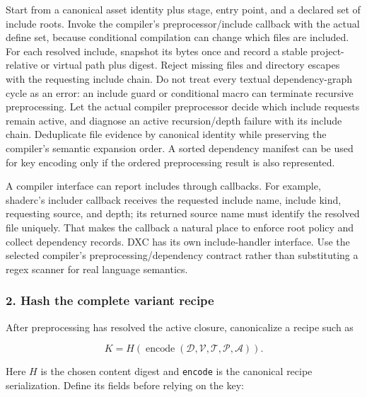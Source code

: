 \hypertarget{05-engine-i-ch010-resolve-a-source-closure-under-a-declared-policy}{}

Start from a canonical asset identity plus stage, entry point, and a declared set of include roots. Invoke the compiler's preprocessor/include callback with the actual define set, because conditional compilation can change which files are included. For each resolved include, snapshot its bytes once and record a stable project-relative or virtual path plus digest. Reject missing files and directory escapes with the requesting include chain. Do not treat every textual dependency-graph cycle as an error: an include guard or conditional macro can terminate recursive preprocessing. Let the actual compiler preprocessor decide which include requests remain active, and diagnose an active recursion/depth failure with its include chain. Deduplicate file evidence by canonical identity while preserving the compiler's semantic expansion order. A sorted dependency manifest can be used for key encoding only if the ordered preprocessing result is also represented.

A compiler interface can report includes through callbacks. For example, shaderc's includer callback receives the requested include name, include kind, requesting source, and depth; its returned source name must identify the resolved file uniquely. That makes the callback a natural place to enforce root policy and collect dependency records. DXC has its own include-handler interface. Use the selected compiler's preprocessing/dependency contract rather than substituting a regex scanner for real language semantics.

\subsubsection{2. Hash the complete variant recipe}\label{05-engine-i-ch010-hash-the-complete-variant-recipe}

\hypertarget{05-engine-i-ch010-hash-the-complete-variant-recipe}{}

After preprocessing has resolved the active closure, canonicalize a recipe such as

\[
K=H(\operatorname{encode}(\mathcal D,\mathcal V,\mathcal T,\mathcal P,\mathcal A)).
\]

Here \(H\) is the chosen content digest and \texttt{encode} is the canonical recipe serialization. Define its fields before relying on the key:

